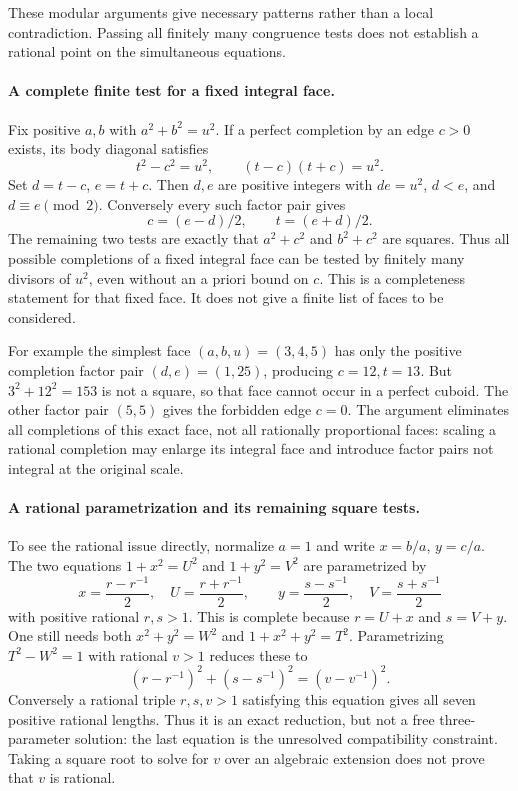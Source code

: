 \documentclass[11pt,a4paper]{article}
\begin{document}
These modular arguments give necessary patterns rather than a local
contradiction. Passing all finitely many congruence tests does not
establish a rational point on the simultaneous equations.

\paragraph{A complete finite test for a fixed integral face.}
Fix positive $a,b$ with $a^2+b^2=u^2$. If a perfect completion by an
edge $c>0$ exists, its body diagonal satisfies
\[
 t^2-c^2=u^2,\qquad (t-c)(t+c)=u^2.
\]
Set $d=t-c$, $e=t+c$. Then $d,e$ are positive integers with
$de=u^2$, $d<e$, and $d\equiv e\pmod2$. Conversely every such factor
pair gives
\[
 c=(e-d)/2,\qquad t=(e+d)/2.
\]
The remaining two tests are exactly that $a^2+c^2$ and $b^2+c^2$
are squares. Thus all possible completions of a fixed integral face
can be tested by finitely many divisors of $u^2$, even without an a
priori bound on $c$. This is a completeness statement for that fixed
face. It does not give a finite list of faces to be considered.

For example the simplest face $(a,b,u)=(3,4,5)$ has only the positive
completion factor pair $(d,e)=(1,25)$, producing $c=12,t=13$.
But $3^2+12^2=153$ is not a square, so that face cannot occur in a
perfect cuboid. The other factor pair $(5,5)$ gives the forbidden edge
$c=0$. The argument eliminates all completions of this exact face,
not all rationally proportional faces: scaling a rational completion
may enlarge its integral face and introduce factor pairs not integral
at the original scale.

\paragraph{A rational parametrization and its remaining square tests.}
To see the rational issue directly, normalize $a=1$ and write
$x=b/a$, $y=c/a$. The two equations $1+x^2=U^2$ and
$1+y^2=V^2$ are parametrized by
\[
 x=\frac{r-r^{-1}}2,\quad U=\frac{r+r^{-1}}2,
 \qquad
 y=\frac{s-s^{-1}}2,\quad V=\frac{s+s^{-1}}2
\]
with positive rational $r,s>1$. This is complete because $r=U+x$ and
$s=V+y$. One still needs both $x^2+y^2=W^2$ and
$1+x^2+y^2=T^2$. Parametrizing $T^2-W^2=1$ with rational $v>1$
reduces these to
\[
 (r-r^{-1})^2+(s-s^{-1})^2=(v-v^{-1})^2.
\]
Conversely a rational triple $r,s,v>1$ satisfying this equation gives
all seven positive rational lengths. Thus it is an exact reduction,
but not a free three-parameter solution: the last equation is the
unresolved compatibility constraint. Taking a square root to solve for
$v$ over an algebraic extension does not prove that $v$ is rational.
\end{document}
